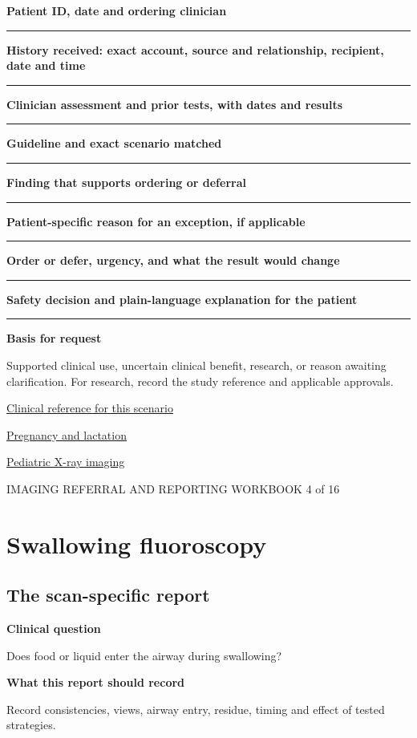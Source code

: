 \documentclass[11pt,a4paper]{article}
\newcommand{\record}[1]{\textbf{#1}\par\vspace{0.55\baselineskip}\hrule\vspace{0.35\baselineskip}}
\begin{document}
\record{Patient ID, date and ordering clinician}

\record{History received: exact account, source and relationship, recipient, date and time}

\record{Clinician assessment and prior tests, with dates and results}

\record{Guideline and exact scenario matched}

\record{Finding that supports ordering or deferral}

\record{Patient-specific reason for an exception, if applicable}

\record{Order or defer, urgency, and what the result would change}

\record{Safety decision and plain-language explanation for the patient}

\textbf{Basis for request}\par Supported clinical use, uncertain clinical benefit, research, or reason awaiting clarification. For research, record the study reference and applicable approvals.\par

\small\href{https://acsearch.acr.org/docs/69471/Narrative}{Clinical reference for this scenario}

\quad\href{https://pubmed.ncbi.nlm.nih.gov/28937575/}{Pregnancy and lactation}

\quad\href{https://www.fda.gov/radiation-emitting-products/medical-imaging/pediatric-x-ray-imaging}{Pediatric X-ray imaging}

\normalsize

\newpage

{\small IMAGING REFERRAL AND REPORTING WORKBOOK \hfill 4 of 16}

\section*{Swallowing fluoroscopy}

\subsection*{The scan-specific report}

\textbf{Clinical question}\par Does food or liquid enter the airway during swallowing?\par

\textbf{What this report should record}\par Record consistencies, views, airway entry, residue, timing and effect of tested strategies.\par
\end{document}
